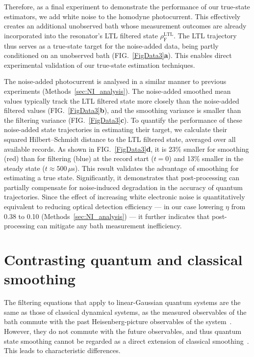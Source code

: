 \documentclass[aps,prx,twocolumn,amsmath,amssymb,superscriptaddress,floatfix,longbibliography
]{revtex4-2}
\begin{document}
Therefore, as a final experiment to demonstrate the performance of our true-state estimators, we add white noise to the homodyne photocurrent. This effectively creates an additional unobserved bath whose measurement outcomes are already incorporated into the resonator’s LTL filtered state $\rho_\text{F}^\text{LTL}$. The LTL trajectory thus serves as a true-state target for the noise-added data, being partly conditioned on an unobserved bath (FIG.~\ref{FigData3}\textbf{a}). This enables direct experimental validation of our true-state estimation techniques.

The noise-added photocurrent is analysed in a similar manner to previous experiments (Methods~\ref{sec:NI_analysis}). The noise-added smoothed mean values typically track the LTL filtered state more closely than the noise-added filtered values (FIG.~\ref{FigData3}\textbf{b}), and the smoothing variance is smaller than the filtering variance (FIG.~\ref{FigData3}\textbf{c}). To quantify the performance of these noise-added state trajectories in estimating their target, we calculate their squared Hilbert–Schmidt distance to the LTL filtered state, averaged over all available records. As shown in FIG.~\ref{FigData3}\textbf{d}, it is 23\% smaller for smoothing (red) than for filtering (blue) at the record start ($t=0$) and 13\% smaller in the steady state ($t \approx 500\,\mu$s). This result validates the advantage of smoothing for estimating a true state. Significantly, it demonstrates that post-processing can partially compensate for noise-induced degradation in the accuracy of quantum trajectories. Since the effect of increasing white electronic noise is quantitatively equivalent to reducing optical detection efficiency --- in our case lowering $\eta$ from 0.38 to 0.10 (Methods~\ref{sec:NI_analysis}) --- it further indicates that post-processing can mitigate any bath measurement inefficiency.

\section{Contrasting quantum and classical smoothing} \label{Sec:traj}

The filtering equations that apply to linear-Gaussian quantum systems are the same as those of classical dynamical systems, as the measured observables of the bath commute with the past Heisenberg-picture observables of the system~\cite{wiseman2009quantum}. However, they do not commute with the future observables, and thus quantum state smoothing cannot be regarded as a direct extension of classical smoothing~\cite{guevara2015quantum}. This leads to characteristic differences.
\end{document}
